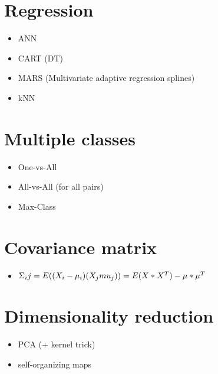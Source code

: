 \documentclass{article}
\begin{document}
\begin{multicols}{3}
\section{Regression}
\begin{itemize}
\item ANN
\item CART (DT)
\item MARS (Multivariate adaptive regression splines)
\item kNN
\end{itemize}

\section{Multiple classes}
\begin{itemize}
\item One-vs-All
\item All-vs-All (for all pairs)
\item Max-Class
\end{itemize}

\section{Covariance matrix}
\begin{itemize}
\item $\Sigma_ij=E((X_i-\mu_i)(X_j\-mu_j))=E(X*X^T)-\mu*\mu^T$
\end{itemize}

\section{Dimensionality reduction}
\begin{itemize}
\item PCA (+ kernel trick)
\item self-organizing maps
\end{itemize}

\end{multicols}
\end{document}
